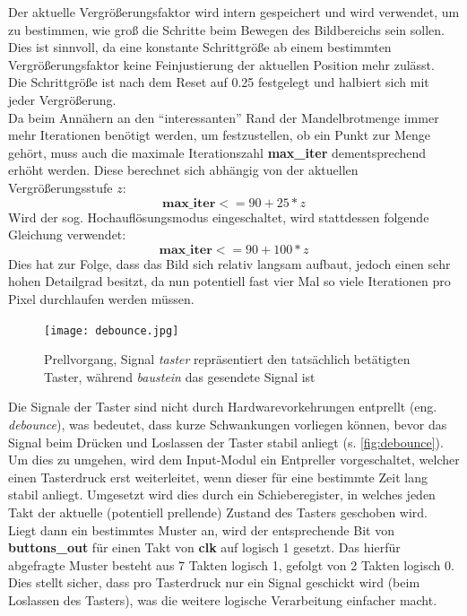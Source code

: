 \documentclass[a4paper,12pt,onesided]{report}
\begin{document}
Der aktuelle Vergrößerungsfaktor wird intern gespeichert und wird verwendet, um zu bestimmen, wie groß die Schritte beim Bewegen des Bildbereichs sein sollen.
Dies ist sinnvoll, da eine konstante Schrittgröße ab einem bestimmten Vergrößerungsfaktor keine Feinjustierung der aktuellen Position mehr zulässt.\\
Die Schrittgröße ist nach dem Reset auf 0.25 festgelegt und halbiert sich mit jeder Vergrößerung.\\
Da beim Annähern an den "`interessanten"' Rand der Mandelbrotmenge immer mehr Iterationen benötigt werden, um festzustellen, ob ein Punkt zur Menge gehört, muss auch die maximale Iterationszahl \textbf{max\_iter} dementsprechend erhöht werden.
Diese berechnet sich abhängig von der aktuellen Vergrößerungsstufe $z$:
\[\mathbf{max\_iter} <= 90+25*z\]
Wird der sog. Hochauflösungsmodus eingeschaltet, wird stattdessen folgende Gleichung verwendet:
\[\mathbf{max\_iter} <= 90+100*z\]
Dies hat zur Folge, dass das Bild sich relativ langsam aufbaut, jedoch einen sehr hohen Detailgrad besitzt, da nun potentiell fast vier Mal so viele Iterationen pro Pixel durchlaufen werden müssen.\\
\begin{figure}[H]
	\centering
	\texttt{[image: debounce.jpg]}
	\caption{Prellvorgang, Signal \textit{taster} repräsentiert den tatsächlich betätigten Taster, während \textit{baustein} das gesendete Signal ist}
	\label{fig:debounce}
\end{figure}
Die Signale der Taster sind nicht durch Hardwarevorkehrungen entprellt (eng. \textit{debounce}), was bedeutet, dass kurze Schwankungen vorliegen können, bevor das Signal beim Drücken und Loslassen der Taster stabil anliegt (s. \autoref{fig:debounce}).\\
Um dies zu umgehen, wird dem Input-Modul ein Entpreller vorgeschaltet, welcher einen Tasterdruck erst weiterleitet, wenn dieser für eine bestimmte Zeit lang stabil anliegt.
Umgesetzt wird dies durch ein Schieberegister, in welches jeden Takt der aktuelle (potentiell prellende) Zustand des Tasters geschoben wird.\\
Liegt dann ein bestimmtes Muster an, wird der entsprechende Bit von \textbf{buttons\_out} für einen Takt von \textbf{clk} auf logisch 1 gesetzt.
Das hierfür abgefragte Muster besteht aus 7 Takten logisch 1, gefolgt von 2 Takten logisch 0.
Dies stellt sicher, dass pro Tasterdruck nur ein Signal geschickt wird (beim Loslassen des Tasters), was die weitere logische Verarbeitung einfacher macht.
\end{document}
